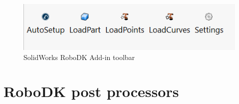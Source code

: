 \begin{figure}[h]
    \centering
    \includegraphics[width=0.6\linewidth]{img/solidworks_toolbar.PNG}
    \caption{SolidWorks RoboDK Add-in toolbar}
    \label{fig:solidworkstoolbar}
\end{figure}

\section{RoboDK post processors}

